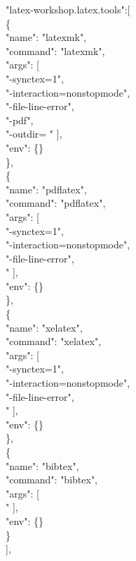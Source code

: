 \documentclass[10pt, UTF8]{ctexart}%
\def\CodingBlock#1{\begin{shaded} \noindent#1 \end{shaded}}
\begin{document}
          \CodingBlock{"latex-workshop.latex.tools":[  \\
          \{  \\
            "name": "latexmk",  \\
            "command": "latexmk",  \\
            "args": [  \\
              "-synctex=1",  \\
              "-interaction=nonstopmode",  \\
              "-file-line-error",  \\
              "-pdf",  \\
              "-outdir=%
              "%
            ],  \\
            "env": \{\}  \\
            \},  \\
            \{  \\
            "name": "pdflatex",  \\
            "command": "pdflatex",  \\
            "args": [  \\
              "-synctex=1",  \\
              "-interaction=nonstopmode",  \\
              "-file-line-error",  \\
              "%
            ],  \\
            "env": \{\}  \\
            \},  \\
            \{  \\
            "name": "xelatex",  \\
            "command": "xelatex",  \\
            "args": [  \\
              "-synctex=1",  \\
              "-interaction=nonstopmode",  \\
              "-file-line-error",  \\
              "%
            ],  \\
            "env": \{\}  \\
            \},  \\
            \{  \\
            "name": "bibtex",  \\
            "command": "bibtex",  \\
            "args": [  \\
              "%
            ],  \\
            "env": \{\}  \\
            \}  \\
            ],  }
\end{document}
